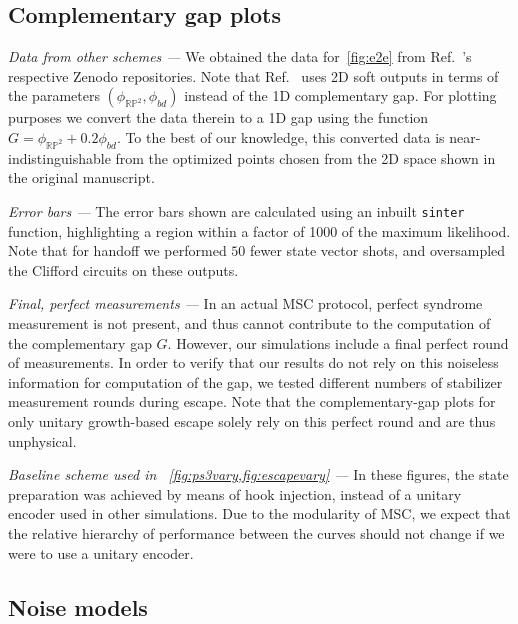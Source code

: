 \documentclass[%
    aps, 
    physrev,
    reprint,
]{revtex4-2}
\begin{document}
\subsection{Complementary gap plots}

\textit{Data from other schemes ---}
We obtained the data for~\cref{fig:e2e} from Ref.~\cite{gidney2024magic, chen2025efficient}'s respective Zenodo repositories. 
Note that Ref.~\cite{chen2025efficient} uses 2D soft outputs in terms of the parameters $(\phi_{\mathbb{RP}^2}, \phi_{bd})$ instead of the 1D complementary gap. 
For plotting purposes we convert the data therein to a 1D gap using the function $G = \phi_{\mathbb{RP}^2}+  0.2 \phi_{bd} $. 
To the best of our knowledge, this converted data is near-indistinguishable from the optimized points chosen from the 2D space shown in the original manuscript.

\textit{Error bars ---}
The error bars shown are calculated using an inbuilt \texttt{sinter} function, highlighting a region within a factor of 1000 of the maximum likelihood. 
Note that for handoff we performed $50$ fewer state vector shots, and oversampled the Clifford circuits on these outputs.

\textit{Final, perfect measurements ---}
In an actual MSC protocol, perfect syndrome measurement is not present, and thus cannot contribute to the computation of the complementary gap $G$. However, our simulations include a final perfect round of measurements. 
In order to verify that our results do not rely on this noiseless information for computation of the gap, we tested different numbers of stabilizer measurement rounds during escape. 
Note that the complementary-gap plots for only unitary growth-based escape solely rely on this perfect round and are thus unphysical.

\textit{Baseline scheme used in ~\cref{fig:ps3vary,fig:escapevary} ---}
In these figures, the state preparation was achieved by means of hook injection, instead of a unitary encoder used in other simulations. 
Due to the modularity of MSC, we expect that the relative hierarchy of performance between the curves should not change if we were to use a unitary encoder. 

\subsection{Noise models}
\end{document}
